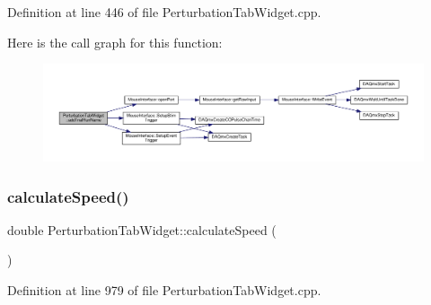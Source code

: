 Definition at line 446 of file Perturbation\+Tab\+Widget.\+cpp.

Here is the call graph for this function\+:
\nopagebreak
\begin{figure}[H]
\begin{center}
\leavevmode
\includegraphics[width=350pt]{class_perturbation_tab_widget_a237937a4a9bd3724fe615d0b5a7b5638_cgraph}
\end{center}
\end{figure}
\mbox{\label{class_perturbation_tab_widget_aa79aeeb2da8075a4cd6ac6c08e0fb135}} 
\subsubsection{\texorpdfstring{calculate\+Speed()}{calculateSpeed()}}
{\footnotesize\ttfamily double Perturbation\+Tab\+Widget\+::calculate\+Speed (\begin{DoxyParamCaption}{ }\end{DoxyParamCaption})}



Definition at line 979 of file Perturbation\+Tab\+Widget.\+cpp.

